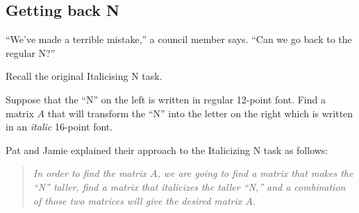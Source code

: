 \documentclass{workbook}
\begin{document}
\begin{iola}
\begin{slide}
\section*{Getting back N}
\question

``We've made a terrible mistake,'' a council member says. ``Can we go back to the regular N?''


Recall the original Italicising N task.

\begin{minipage}{.5\textwidth}
\hfill
{}\hfill
\end{minipage}
\begin{minipage}{.5\textwidth}

Suppose that the ``N'' on the left is written in regular 12-point font.  Find a matrix $A$ that will transform
	the ``N'' into the letter on the right which is written in an \emph{italic} 16-point font.
\end{minipage}

Pat and Jamie explained their approach to the Italicizing N task as follows:
\begin{quote}\itshape
	In order to find the matrix $A$, we are going to find a matrix that makes the ``N'' taller,
	find a matrix that italicizes the taller ``N,'' and a combination of those two matrices
	will give the desired matrix $A$.
\end{quote}



\end{slide}
\end{iola}
\end{document}
